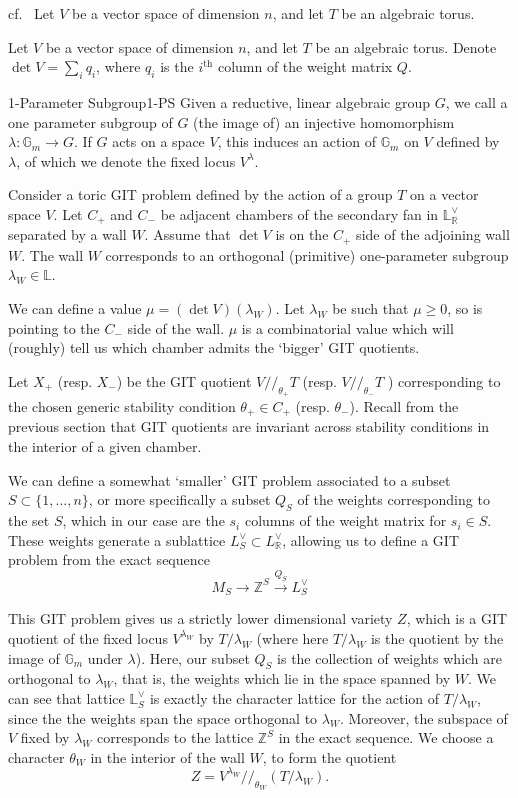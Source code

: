 cf.~\cite{Kite_2022,ballard2014variation} Let $V$ be a vector space of dimension $n$, and let $T$ be an algebraic torus.

Let $V$ be a vector space of dimension $n$, and let $T$ be an algebraic torus. Denote $\det V = \sum_i q_i$, where $q_i$ is the $i^\mathrm{th}$ column of the weight matrix $Q$. 

\begin{definition}{1-Parameter Subgroup}{1-PS}
    Given a reductive, linear algebraic group $G$, we call a one parameter subgroup of $G$ (the image of) an injective homomorphism $\lambda : \mathbb{G}_{m}\to G$. If $G$ acts on a space $V$, this induces an action of $\mathbb{G}_m$ on $V$ defined by $\lambda$, of which we denote the fixed locus $V^\lambda$. 
\end{definition}

Consider a toric GIT problem defined by the action of a group $T$ on a vector space $V$. Let $C_+$ and $C_-$ be adjacent chambers of the secondary fan in $\mathbb{L}^{\vee}_\mathbb{R}$ separated by a wall $W$. Assume that $\det V$ is on the $C_{+}$ side of the adjoining wall $W$. The wall $W$ corresponds to an orthogonal (primitive) one-parameter subgroup $\lambda_{W}\in \mathbb{L}$.

We can define a value $\mu = (\det V)(\lambda_W)$. Let $\lambda_W$ be such that $\mu \geq 0$, so is pointing to the $C_-$ side of the wall. $\mu$ is a combinatorial value which will (roughly) tell us which chamber admits the `bigger' GIT quotients. 

Let $X_+$ (resp. $X_-$) be the GIT quotient $V // _{\theta_{+}}T$ (resp. $V // _{\theta_{-}}T$ ) corresponding to the chosen generic stability condition $\theta_{+}\in C_+$ (resp. $\theta_-$).  Recall from the previous section that GIT quotients are invariant across stability conditions in the interior of a given chamber. 

We can define a somewhat `smaller' GIT problem associated to a subset $S \subset \{ 1,\dots,n \}$, or more specifically a subset $Q_S$ of the weights corresponding to the set $S$, which in our case are the $s_i$ columns of the weight matrix for $s_{i}\in S$. These weights generate a sublattice $L_{S}^\vee\subset L_\mathbb{R}^\vee$, allowing us to define a GIT problem from the exact sequence $$M_{S}\to \mathbb{Z}^{S}\xrightarrow{Q_{S}}L_{S}^{\vee}$$

This GIT problem gives us a strictly lower dimensional variety $Z$, which is a GIT quotient of the fixed locus $V^{\lambda_{W}}$ by $T/\lambda_W$ (where here $T/ \lambda_W$ is the quotient by the image of $\mathbb{G}_m$ under $\lambda$). Here, our subset $Q_S$  is the collection of weights which are orthogonal to $\lambda_W$, that is, the weights which lie in the space spanned by $W$. We can see that lattice $\mathbb{L}_S^\vee$ is exactly the character lattice for the action of $T/\lambda_W$, since the the weights span the space orthogonal to $\lambda_W$. Moreover, the subspace of $V$ fixed by $\lambda_W$ corresponds to the lattice $\mathbb{Z}^S$ in the exact sequence. We choose a character $\theta_W$ in the interior of the wall $W$, to form the quotient $$Z = V^{\lambda_{W}} / /_{\theta_{W}} \left( T/ \lambda_{W}\right) . $$


